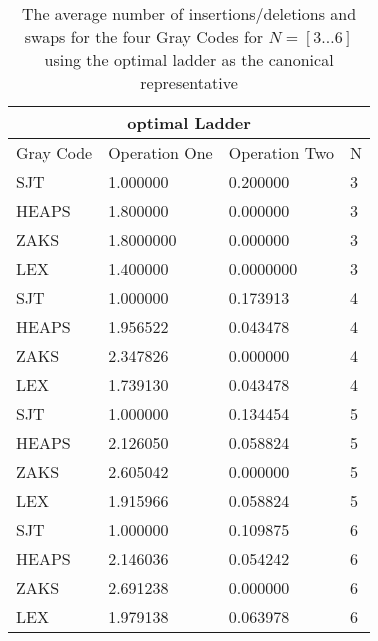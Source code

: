 


\begin{table}
\begin{tabular}{ |p{3cm}||p{3cm}|p{3cm}|p{3cm}|}
 \hline
 \multicolumn{4}{|c|}{optimal Ladder} \\
 \hline
 Gray Code& Operation One &Operation Two& N\\
 \hline
 SJT  & 1.000000 &0.200000 & 3\\
 HEAPS & 1.800000 & 0.000000 & 3 \\
 ZAKS & 1.8000000 & 0.000000 &  3\\
 LEX & 1.400000 & 0.0000000 &  3\\
 \hline

 SJT  & 1.000000 &0.173913 & 4\\
 HEAPS & 1.956522 & 0.043478 & 4 \\
 ZAKS & 2.347826 & 0.000000&  4\\
 LEX & 1.739130 & 0.043478 &  4\\
 \hline
 
 SJT  & 1.000000 &0.134454& 5\\
 HEAPS & 2.126050 & 0.058824 & 5 \\
 ZAKS & 2.605042 & 0.000000 &  5\\
 LEX & 1.915966 & 0.058824 &  5\\
 \hline
 
 SJT  & 1.000000 &0.109875 & 6\\
 HEAPS & 2.146036 & 0.054242 & 6\\
 ZAKS & 2.691238 & 0.000000 &  6\\
 LEX & 1.979138 & 0.063978&  6\\
 \hline
\end{tabular}
\caption{\label{tab:table-name}The average number of insertions/deletions and swaps for 
the four Gray Codes for $N=[3 \dots 6]$ using the optimal ladder as the canonical representative }
\end{table}

